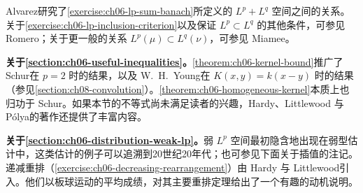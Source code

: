 \documentclass[../../main.tex]{subfiles}
\begin{document}
Alvarez\cite{folland-bib-5}研究了\cref{exercise:ch06-lp-sum-banach}所定义的 $L^p+L^q$ 空间之间的关系。关于\cref{exercise:ch06-lp-inclusion-criterion}以及保证 $L^p\subset L^q$ 的其他条件，可参见 Romero\cite{folland-bib-120}；关于更一般的关系 $L^p(\mu)\subset L^q(\nu)$，可参见 Miamee\cite{folland-bib-100}。



\textbf{关于\cref{section:ch06-useful-inequalities}。}\cref{theorem:ch06-kernel-bound}推广了 Schur\cite{folland-bib-129}在 $p=2$ 时的结果，以及 W.~H.~Young\cite{folland-bib-164}在 $K(x,y)=k(x-y)$ 时的结果（参见\cref{section:ch08-convolution}）。\cref{theorem:ch06-homogeneous-kernel}本质上也归功于 Schur\cite{folland-bib-129}。如果本节的不等式尚未满足读者的兴趣，Hardy、Littlewood 与 Pólya\cite{folland-bib-65}的著作还提供了丰富内容。

\textbf{关于\cref{section:ch06-distribution-weak-lp}。}弱 $L^p$ 空间最初隐含地出现在弱型估计中，这类估计的例子可以追溯到20世纪20年代；也可参见下面关于插值的注记。递减重排（\cref{exercise:ch06-decreasing-rearrangement}）由 Hardy 与 Littlewood\cite{folland-bib-064}引入。他们以板球运动的平均成绩，对其主要重排定理给出了一个有趣的动机说明。


\end{document}
